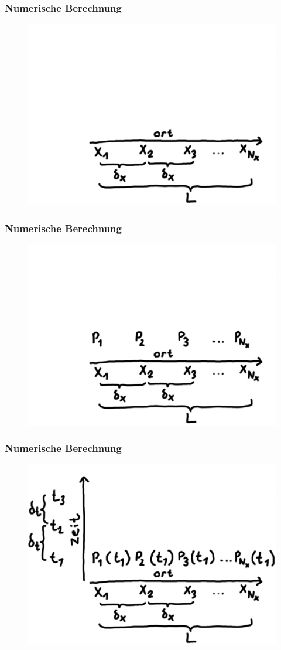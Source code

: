 \documentclass{beamer}
\begin{document}
\begin{frame}
\frametitle{Numerische Berechnung}
\begin{figure}
	\includegraphics[width=0.8\linewidth,height=\textheight,keepaspectratio]{./numerisch2.png}
\end{figure}
\end{frame}
\begin{frame}
\frametitle{Numerische Berechnung}
\begin{figure}
	\includegraphics[width=0.8\linewidth,height=\textheight,keepaspectratio]{./numerisch3.png}
\end{figure}
\end{frame}
\begin{frame}
\frametitle{Numerische Berechnung}
\begin{figure}
	\includegraphics[width=0.8\linewidth,height=\textheight,keepaspectratio]{./numerisch4.png}
\end{figure}
\end{frame}
\end{document}
